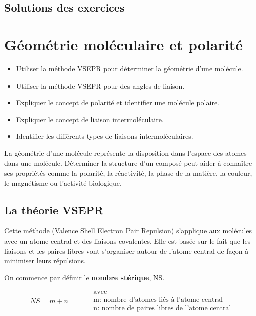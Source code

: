 \documentclass[
  11pt,
  french,
  a4paper,
  openany]{book}
\providecommand{\tightlist}{%
  \setlength{\itemsep}{0pt}\setlength{\parskip}{0pt}}
\begin{document}
\section{Solutions des exercices} \shipoutAnswer

\hypertarget{guxe9omuxe9trie-moluxe9culaire-et-polarituxe9}{%
\chapter{Géométrie moléculaire et polarité}\label{guxe9omuxe9trie-moluxe9culaire-et-polarituxe9}}

\begin{objectives}

\begin{itemize}
\tightlist
\item
  Utiliser la méthode VSEPR pour déterminer la géométrie d'une molécule.
\item
  Utiliser la méthode VSEPR pour des angles de liaison.
\item
  Expliquer le concept de polarité et identifier une molécule polaire.
\item
  Expliquer le concept de liaison intermoléculaire.
\item
  Identifier les différents types de liaisons intermoléculaires.
\end{itemize}


\end{objectives}

La géométrie d'une molécule représente la disposition dans l'espace des atomes dans une molécule. Déterminer la structure d'un composé peut aider à connaître ses propriétés comme la polarité, la réactivité, la phase de la matière, la couleur, le magnétisme ou l'activité biologique.

\hypertarget{la-thuxe9orie-vsepr}{%
\section{La théorie VSEPR}\label{la-thuxe9orie-vsepr}}

Cette méthode (Valence Shell Electron Pair Repulsion) s'applique aux molécules avec un atome central et des liaisons covalentes. Elle est basée sur le fait que les liaisons et les paires libres vont s'organiser autour de l'atome central de façon à minimiser leurs répulsions.

On commence par définir le \textbf{nombre stérique}, NS.

\[ \begin{split}
    NS = m + n
  \end{split}
  \qquad
  \begin{split}
    &\text{avec} \\
    &\text{m: nombre d'atomes liés à l'atome central} \\
    &\text{n: nombre de paires libres de l'atome central}
  \end{split} \]
\end{document}
